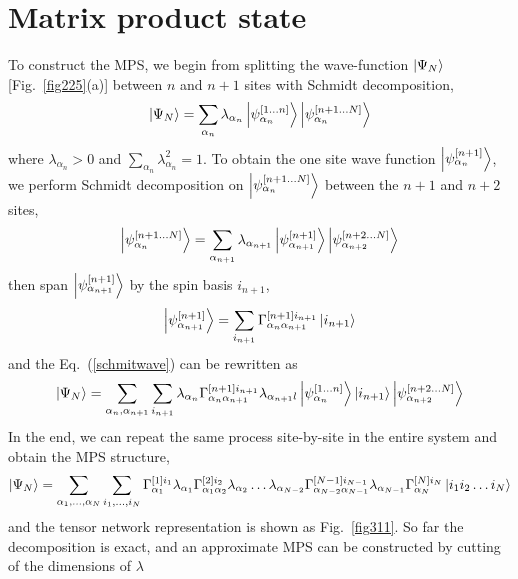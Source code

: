 \section{Matrix product state}
\label{MPS}

To construct the MPS, we begin from splitting the wave-function $\Ket{\Psi_N}$ [Fig.~\ref{fig225}(a)] between $n$ and $n+1$ sites with Schmidt decomposition, 
\begin{align}
	\label{schmitwave}
	\Ket{\Psi_{N}} = \sum_{\alpha_n} \lambda_{\alpha_n} \Ket{\psi_{\alpha_n}^{[1\dots n]}} \Ket{\psi_{\alpha_n}^{[n+1\dots N]}}
\end{align}
where $\lambda_{\alpha_n} > 0$ and $\sum\limits_{\alpha_n}{\lambda_{\alpha_n}^2 = 1}$. To obtain the one site wave function $\Ket{\psi_{\alpha_n}^{[n+1]}}$, we perform Schmidt decomposition on $\Ket{\psi_{\alpha_n}^{[n+1\dots N]}}$ between the $n+1$ and $n+2$ sites,
\begin{align}
	\Ket{\psi_{\alpha_n}^{[n+1\dots N]}} = \sum_{\alpha_{n+1}} \lambda_{\alpha_{n+1}} \Ket{\psi_{\alpha_{n+1}}^{[n+1]}} \Ket{\psi_{\alpha_{n+2}}^{[n+2\dots N]}}
\end{align}
then span $\Ket{\psi_{\alpha_{n+1}}^{[n+1]}}$ by the spin basis $i_{n+1}$,
\begin{align}
	\Ket{\psi_{\alpha_{n+1}}^{[n+1]}} = \sum_{i_{n+1}}{\Gamma^{[n+1] i_{n+1}}_{\alpha_n \alpha_{n+1}} \Ket{i_{n+1}}}
\end{align}
and the Eq.~(\ref{schmitwave}) can be rewritten as
\begin{align}
	\Ket{\Psi_{N}} = \sum_{\alpha_n,\alpha_{n+1}}\sum_{i_{n+1}}{\lambda_{\alpha_n} \Gamma^{[n+1] i_{n+1}}_{\alpha_n \alpha_{n+1}} \lambda_{\alpha_{n+1}l} \Ket{\psi_{\alpha_n}^{[1\dots n]}} \Ket{i_{n+1}} \Ket{\psi_{\alpha_{n+2}}^{[n+2\dots N]}} }
\end{align}
In the end, we can repeat the same process site-by-site in the entire system and obtain the MPS structure,
\begin{align}
	\Ket{\Psi_N} = \sum_{\alpha_1,\dots ,\alpha_N}\sum_{i_1,\dots ,i_N}{ \Gamma^{[1] i_{1}}_{\alpha_1} \lambda_{\alpha_1} \Gamma^{[2] i_{2}}_{\alpha_1 \alpha_{2}} \lambda_{\alpha_2} \dots  \lambda_{\alpha_{N-2}} \Gamma^{[N-1] i_{N-1}}_{\alpha_{N-2} \alpha_{N-1}} \lambda_{\alpha_{N-1}} \Gamma^{[N] i_{N}}_{\alpha_{N}} \Ket{i_1 i_2 \dots i_N}}
\end{align}
and the tensor network representation is shown as Fig.~\ref{fig311}. So far the decomposition is exact, and an approximate MPS can be constructed by cutting of the dimensions of $\lambda$

